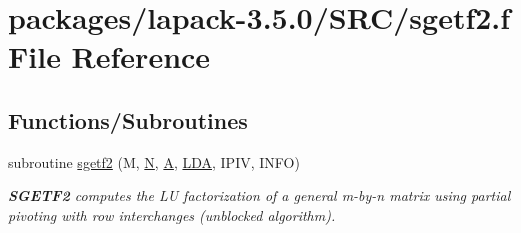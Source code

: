 \hypertarget{sgetf2_8f}{}\section{packages/lapack-\/3.5.0/\+S\+R\+C/sgetf2.f File Reference}
\label{sgetf2_8f}
\subsection*{Functions/\+Subroutines}
\begin{DoxyCompactItemize}
\item 
subroutine \hyperlink{group__realGEcomputational_gab9b698b35b884b4d17b9713e76fabe37}{sgetf2} (M, \hyperlink{polmisc_8c_a0240ac851181b84ac374872dc5434ee4}{N}, \hyperlink{classA}{A}, \hyperlink{example__user_8c_ae946da542ce0db94dced19b2ecefd1aa}{L\+D\+A}, I\+P\+I\+V, I\+N\+F\+O)
\begin{DoxyCompactList}\small\item\em {\bfseries S\+G\+E\+T\+F2} computes the L\+U factorization of a general m-\/by-\/n matrix using partial pivoting with row interchanges (unblocked algorithm). \end{DoxyCompactList}\end{DoxyCompactItemize}
